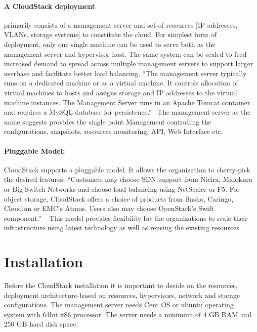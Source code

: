 \paragraph {A CloudStack deployment} primarily consists of a management server and
set of resources [IP addresses, VLANs, storage systems] to constitute
the cloud.  For simplest form of deployment, only one single machine
can be used to serve both as the management server and hypervisor
host. The same system can be scaled to feed increased demand to spread
across multiple management servers to support larger userbase and
facilitate better load balancing. ``The management server typically runs
on a dedicated machine or as a virtual machine. It controls allocation
of virtual machines to hosts and assigns storage and IP addresses to
the virtual machine instances. The Management Server runs in an Apache
Tomcat container and requires a MySQL database for
persistence.''~\cite{hid-sp18-417-www-cloudstack-management-server} 
The management server as the name suggests provides the single point 
Management controlling the configurations, snapshots, resources monitoring, 
API, Web Interface etc. 

\paragraph {Pluggable Model:} CloudStack supports a pluggable model. It 
allows the organization to cherry-pick the desired features. ``Customers may 
choose SDN support from Nicira, Midokura or Big Switch Networks and choose load
balancing using NetScaler or F5. For object storage, CloudStack offers a choice of
products from Basho, Caringo, Cloudian or EMC's Atmos. Users also may choose
OpenStack's Swift component.'' ~\cite{hid-sp18-417-www-cloudstack-model }
This model provides flexibility for the organizations to scale their infrastructure 
using latest technology as well as reusing the existing resources.

\section{Installation}

Before the CloudStack installation it is important to decide on the resources,
deployment architecture-based on resources, hypervisors, network and storage 
configurations. The management server needs Cent OS or ubuntu operating system
with 64bit x86 processor. The server needs a minimum of 4 GB RAM and 250 GB
hard disk space. 

